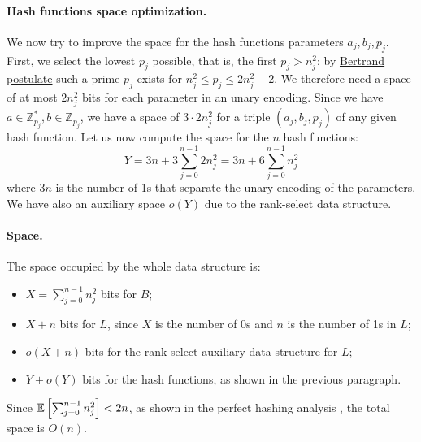 \paragraph{Hash functions space optimization.} We now try to improve the space for the hash functions parameters $a_j, b_j, p_j$.
First, we select the lowest $p_j$ possible, that is, the first $p_j > n_j^2$: by
\href{https://en.wikipedia.org/wiki/Bertrand\%27s_postulate}{Bertrand postulate}
such a prime $p_j$ exists for $n_j^2 \leq p_j \leq 2n_j^2 - 2$.
We therefore need a space of at most $2n_j^2$ bits for each parameter in an unary
encoding.
Since we have $a \in \mathbb{Z}_{p_j}^*, b \in \mathbb{Z}_{p_j}$, we have a space
of $3 \cdot 2n_j^2$ for a triple $(a_j, b_j, p_j)$ of any given hash function.
Let us now compute the space for the $n$ hash functions:
$$Y=3n+3 \sum_{j=0}^{n-1}2n_j^2 = 3n+6 \sum_{j=0}^{n-1}n_j^2$$
where $3n$ is the number of 1s that separate the unary encoding of the parameters. We have also an auxiliary space $o(Y)$ due to the rank-select data structure. 

\paragraph{Space.} The space occupied by the whole data structure is:
\begin{itemize}
  \item $X=\sum_{j=0}^{n-1}n_j^2$ bits for $B$;
  \item $X+n$ bits for $L$, since $X$ is the number of 0s and $n$ is the number of 1s in $L$;
  \item $o(X+n)$ bits for the rank-select auxiliary data structure for $L$;
  \item $Y+o(Y)$ bits for the hash functions, as shown in the previous paragraph.
\end{itemize}
Since $\mathbb{E}\left[{\sum_{j=0}^{n-1}n_j^2}\right] < 2n$, as shown in the perfect hashing analysis \cite[281]{Cormen09}, the total space is $O(n)$.
